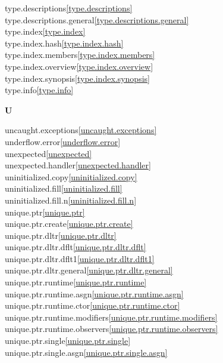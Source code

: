 \begin{multicols}{2}
type.descriptions\quad\ref{type.descriptions}\\
type.descriptions.general\quad\ref{type.descriptions.general}\\
type.index\quad\ref{type.index}\\
type.index.hash\quad\ref{type.index.hash}\\
type.index.members\quad\ref{type.index.members}\\
type.index.overview\quad\ref{type.index.overview}\\
type.index.synopsis\quad\ref{type.index.synopsis}\\
type.info\quad\ref{type.info}\\
\par \textbf{U}\par
uncaught.exceptions\quad\ref{uncaught.exceptions}\\
underflow.error\quad\ref{underflow.error}\\
unexpected\quad\ref{unexpected}\\
unexpected.handler\quad\ref{unexpected.handler}\\
uninitialized.copy\quad\ref{uninitialized.copy}\\
uninitialized.fill\quad\ref{uninitialized.fill}\\
uninitialized.fill.n\quad\ref{uninitialized.fill.n}\\
unique.ptr\quad\ref{unique.ptr}\\
unique.ptr.create\quad\ref{unique.ptr.create}\\
unique.ptr.dltr\quad\ref{unique.ptr.dltr}\\
unique.ptr.dltr.dflt\quad\ref{unique.ptr.dltr.dflt}\\
unique.ptr.dltr.dflt1\quad\ref{unique.ptr.dltr.dflt1}\\
unique.ptr.dltr.general\quad\ref{unique.ptr.dltr.general}\\
unique.ptr.runtime\quad\ref{unique.ptr.runtime}\\
unique.ptr.runtime.asgn\quad\ref{unique.ptr.runtime.asgn}\\
unique.ptr.runtime.ctor\quad\ref{unique.ptr.runtime.ctor}\\
unique.ptr.runtime.modifiers\quad\ref{unique.ptr.runtime.modifiers}\\
unique.ptr.runtime.observers\quad\ref{unique.ptr.runtime.observers}\\
unique.ptr.single\quad\ref{unique.ptr.single}\\
unique.ptr.single.asgn\quad\ref{unique.ptr.single.asgn}\\

\end{multicols}
